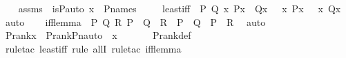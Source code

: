 \begin{isabellebody}
%
\isadelimproof
%
\endisadelimproof
%
\isatagproof
{}\isamarkupfalse%
{\isacharminus}{\kern0pt}\isanewline
\ \ \isamarkupfalse%
\ assms\ {\isacharcolon}{\kern0pt}\ {\isachardoublequoteopen}is{\isacharunderscore}{\kern0pt}P{\isacharunderscore}{\kern0pt}auto{\isacharparenleft}{\kern0pt}{\isasympi}{\isacharparenright}{\kern0pt}{\isachardoublequoteclose}\ {\isachardoublequoteopen}x\ {\isasymin}\ P{\isacharunderscore}{\kern0pt}names{\isachardoublequoteclose}\ \isanewline
\ \ \isamarkupfalse%
\ least{\isacharunderscore}{\kern0pt}iff\ {\isacharcolon}{\kern0pt}\ {\isachardoublequoteopen}{\isasymAnd}P\ Q{\isachardot}{\kern0pt}\ {\isasymforall}x{\isachardot}{\kern0pt}\ P{\isacharparenleft}{\kern0pt}x{\isacharparenright}{\kern0pt}\ {\isasymlongleftrightarrow}\ Q{\isacharparenleft}{\kern0pt}x{\isacharparenright}{\kern0pt}\ {\isasymLongrightarrow}\ {\isacharparenleft}{\kern0pt}{\isasymmu}\ x{\isachardot}{\kern0pt}\ P{\isacharparenleft}{\kern0pt}x{\isacharparenright}{\kern0pt}{\isacharparenright}{\kern0pt}\ {\isacharequal}{\kern0pt}\ {\isacharparenleft}{\kern0pt}{\isasymmu}\ x{\isachardot}{\kern0pt}\ Q{\isacharparenleft}{\kern0pt}x{\isacharparenright}{\kern0pt}{\isacharparenright}{\kern0pt}{\isachardoublequoteclose}\ \isamarkupfalse%
\ auto\isanewline
\ \ \isamarkupfalse%
\ iff{\isacharunderscore}{\kern0pt}lemma\ {\isacharcolon}{\kern0pt}\ {\isachardoublequoteopen}{\isasymAnd}P\ Q\ R{\isachardot}{\kern0pt}\ {\isacharparenleft}{\kern0pt}P\ {\isasymLongrightarrow}\ Q\ {\isasymlongleftrightarrow}\ R{\isacharparenright}{\kern0pt}\ {\isasymLongrightarrow}\ P\ {\isasymand}\ Q\ {\isasymlongleftrightarrow}\ P\ {\isasymand}\ R{\isachardoublequoteclose}\ \isamarkupfalse%
\ auto\ \isanewline
\ \ \isamarkupfalse%
\ {\isachardoublequoteopen}P{\isacharunderscore}{\kern0pt}rank{\isacharparenleft}{\kern0pt}x{\isacharparenright}{\kern0pt}\ {\isacharequal}{\kern0pt}\ P{\isacharunderscore}{\kern0pt}rank{\isacharparenleft}{\kern0pt}Pn{\isacharunderscore}{\kern0pt}auto{\isacharparenleft}{\kern0pt}{\isasympi}{\isacharparenright}{\kern0pt}\ {\isacharbackquote}{\kern0pt}\ x{\isacharparenright}{\kern0pt}{\isachardoublequoteclose}\ \isanewline
\ \ \ \ \isamarkupfalse%
\ P{\isacharunderscore}{\kern0pt}rank{\isacharunderscore}{\kern0pt}def\ \isanewline
\ \ \ \ \isamarkupfalse%
\ {\isacharparenleft}{\kern0pt}rule{\isacharunderscore}{\kern0pt}tac\ least{\isacharunderscore}{\kern0pt}iff{\isacharsemicolon}{\kern0pt}\ rule\ allI{\isacharsemicolon}{\kern0pt}\ rule{\isacharunderscore}{\kern0pt}tac\ iff{\isacharunderscore}{\kern0pt}lemma{\isacharparenright}{\kern0pt}\isanewline

\end{isabellebody}
